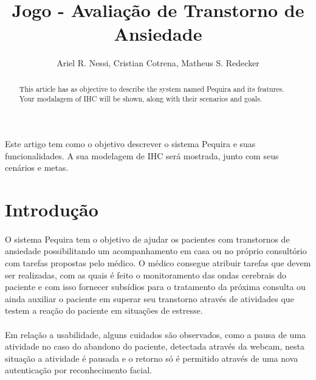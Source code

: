 \documentclass[12pt]{article}
\title{Jogo - Avaliação de Transtorno de Ansiedade}
\author{Ariel R. Nessi, Cristian Cotrena, Matheus S. Redecker}
\begin{document}
 

\maketitle

\begin{abstract}
This article has as objective to describe the system named Pequira and its features. Your modalagem of IHC will be shown, along with their scenarios and goals.
\end{abstract}
     
\begin{resumo} 
  Este artigo tem como o objetivo descrever o sistema Pequira e suas funcionalidades. A sua modelagem de IHC será mostrada, junto com seus cenários e metas.
\end{resumo}


\section{Introdução}


\paragraph{} O sistema Pequira tem o objetivo de ajudar os pacientes com transtornos de ansiedade possibilitando um acompanhamento em casa ou no próprio consultório com tarefas propostas pelo médico. O médico consegue atribuir tarefas que devem ser realizadas, com as quais é feito o monitoramento das ondas cerebrais do paciente e com isso fornecer subsídios para o tratamento da próxima consulta ou ainda auxiliar o paciente em superar seu transtorno através de atividades que testem a reação do paciente  em situações de estresse.
\paragraph{} Em relação a usabilidade, alguns cuidados são observados, como a pausa de uma atividade no caso do abandono do paciente, detectada através da webcam, nesta situação a atividade é pausada e o retorno só é permitido através de uma nova autenticação por reconhecimento facial.

\end{document}
